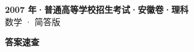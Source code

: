 \documentclass[zihao=-4, a4paper]{ctexart}
\begin{document}
\begin{center}
  {\Large\bfseries 2007 年·普通高等学校招生考试·安徽卷·理科}\\[4pt]
  {\large 数学 · 简答版}
\end{center}
\medskip
{}

\clearpage
{}
\begin{center}{\Large\bfseries 答案速查}\end{center}
\medskip

\end{document}
